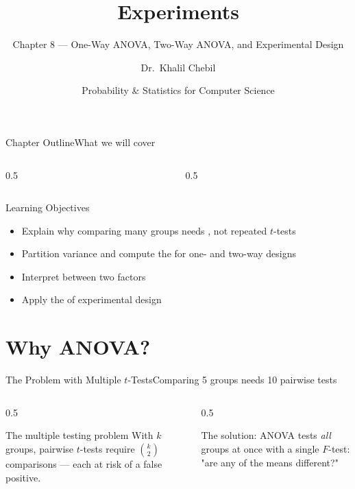 \documentclass[aspectratio=169,11pt]{beamer}
\title[Ch.\,8 — Experiments]{Experiments}
\subtitle{Chapter 8 — One-Way ANOVA, Two-Way ANOVA, and Experimental Design}
\author{Dr.\ Khalil Chebil}
\date{Probability \& Statistics for Computer Science}
\begin{document}
{
\begin{frame}
  \titlepage
\end{frame}}

\begin{frame}{Chapter Outline}{What we will cover}
  \begin{columns}[T]
    \begin{column}{0.5\textwidth}
      \tableofcontents[sections={1-4}]
    \end{column}
    \begin{column}{0.5\textwidth}
      \tableofcontents[sections={5-7}]
    \end{column}
  \end{columns}
  \vfill
  \begin{block}{Learning Objectives}
    \begin{itemize}
      \item Explain why comparing many groups needs , not repeated $t$-tests
      \item Partition variance and compute the  for one- and two-way designs
      \item Interpret  between two factors
      \item Apply the  of experimental design
    \end{itemize}
  \end{block}
\end{frame}

\section{Why ANOVA?}

\begin{frame}{The Problem with Multiple $t$-Tests}{Comparing 5 groups needs 10 pairwise tests}
  \begin{columns}[T]
    \begin{column}{0.5\textwidth}
      \begin{alertblock}{The multiple testing problem}
        \small With $k$ groups, pairwise $t$-tests require
        $\binom{k}{2}$ comparisons — each at risk of a false positive.
      \end{alertblock}
    \end{column}
    \begin{column}{0.5\textwidth}
      \begin{exampleblock}{The solution: ANOVA}
        \small {} tests \emph{all} groups at
        once with a single $F$-test: "are any of the means different?"
      \end{exampleblock}
    \end{column}
  \end{columns}
\end{frame}
\end{document}
